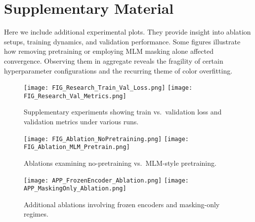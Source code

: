 \documentclass{article}
\begin{document}



\clearpage
\appendix

\section{Supplementary Material}
Here we include additional experimental plots. They provide insight into ablation setups, training dynamics, and validation performance. Some figures illustrate how removing pretraining or employing MLM masking alone affected convergence. Observing them in aggregate reveals the fragility of certain hyperparameter configurations and the recurring theme of color overfitting.

\begin{figure}[h]
\centering
\texttt{[image: FIG\_Research\_Train\_Val\_Loss.png]}
\texttt{[image: FIG\_Research\_Val\_Metrics.png]}
\caption{Supplementary experiments showing train vs.\ validation loss and validation metrics under various runs.}
\label{fig:supp_research}
\end{figure}

\begin{figure}[h]
\centering
\texttt{[image: FIG\_Ablation\_NoPretraining.png]}
\texttt{[image: FIG\_Ablation\_MLM\_Pretrain.png]}
\caption{Ablations examining no-pretraining vs.\ MLM-style pretraining.}
\label{fig:ablation}
\end{figure}

\begin{figure}[h]
\centering
\texttt{[image: APP\_FrozenEncoder\_Ablation.png]}
\texttt{[image: APP\_MaskingOnly\_Ablation.png]}
\caption{Additional ablations involving frozen encoders and masking-only regimes.}
\label{fig:app_frozen}
\end{figure}
\end{document}
